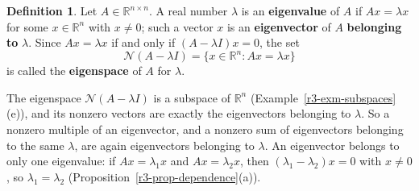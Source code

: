 \documentclass[12pt]{article}
\newcommand{\R}{\mathbb R}
\theoremstyle{definition}
\newtheorem{definition}[theorem]{Definition}
\begin{document}
\begin{definition}\label{r7-def-eigen}
Let \(A\in\R^{n\times n}\). A real number \(\lambda\) is an \textbf{eigenvalue} of \(A\) if \(Ax=\lambda x\) for some
\(x\in\R^n\) with \(x\ne0\); such a vector \(x\) is an \textbf{eigenvector} of \(A\) \textbf{belonging to}
\(\lambda\). Since \(Ax=\lambda x\) if and only if \((A-\lambda I)x=0\), the set
\[
\mathcal N(A-\lambda I)=\{x\in\R^n:Ax=\lambda x\}
\]
is called the \textbf{eigenspace} of \(A\) for \(\lambda\).
\end{definition}
The eigenspace \(\mathcal N(A-\lambda I)\) is a subspace of \(\R^n\) (Example~\ref{r3-exm-subspaces}(e)), and its
nonzero vectors are exactly the eigenvectors belonging to \(\lambda\). So a nonzero multiple of an eigenvector, and a
nonzero sum of eigenvectors belonging to the same \(\lambda\), are again eigenvectors belonging to \(\lambda\). An
eigenvector belongs to only one eigenvalue: if \(Ax=\lambda_1x\) and \(Ax=\lambda_2x\), then
\((\lambda_1-\lambda_2)x=0\) with \(x\ne0\), so \(\lambda_1=\lambda_2\) (Proposition~\ref{r3-prop-dependence}(a)).
\end{document}

